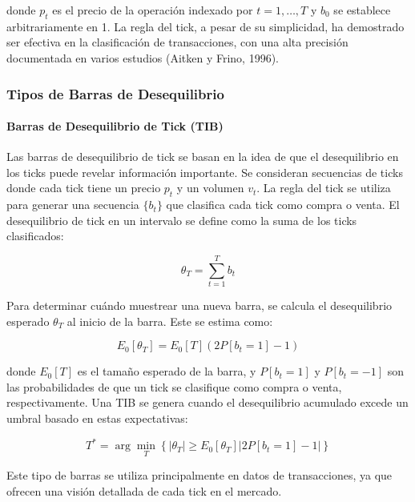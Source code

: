 \documentclass[a4paper,12pt]{report}
\begin{document}
donde \(p_t\) es el precio de la operación indexado por \(t = 1,\ldots,T\) y \(b_0\) se establece arbitrariamente en 1. 
La regla del tick, a pesar de su simplicidad, ha demostrado ser efectiva en la clasificación de transacciones, con una 
alta precisión documentada en varios estudios (Aitken y Frino, 1996).

\subsubsection{Tipos de Barras de Desequilibrio}

\paragraph{Barras de Desequilibrio de Tick (TIB)}

Las barras de desequilibrio de tick se basan en la idea de que el desequilibrio en los ticks puede revelar información 
importante. Se consideran secuencias de ticks donde cada tick tiene un precio \(p_t\) y un volumen \(v_t\). La regla del tick 
se utiliza para generar una secuencia \(\{b_t\}\) que clasifica cada tick como compra o venta. El desequilibrio de tick en un 
intervalo se define como la suma de los ticks clasificados:

\begin{equation}
\theta_T = \sum_{t=1}^{T} b_t
\end{equation}

Para determinar cuándo muestrear una nueva barra, se calcula el desequilibrio esperado \(\theta_T\) al inicio de la barra. 
Este se estima como:

\begin{equation}
E_0[\theta_T] = E_0[T](2P[b_t = 1] - 1)
\end{equation}

donde \(E_0[T]\) es el tamaño esperado de la barra, y \(P[b_t = 1]\) y \(P[b_t = -1]\) son las probabilidades de que un tick 
se clasifique como compra o venta, respectivamente. Una TIB se genera cuando el desequilibrio acumulado excede un umbral basado 
en estas expectativas:

\begin{equation}
T^* = \arg \min_T \left\{  | \theta_T | \geq E_0[\theta_T] |2P[b_t = 1] - 1 | \right\}
\end{equation}

Este tipo de barras se utiliza principalmente en datos de transacciones, ya que ofrecen una visión detallada de cada tick 
en el mercado.
\end{document}
